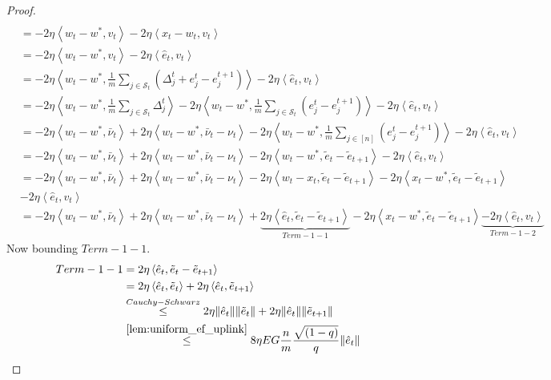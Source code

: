 \documentclass{article} %
\def\S{{\mathcal S}}
\newcommand{\inner}[2]{\left\langle #1, #2 \right\rangle}
\begin{document}
\begin{proof}
\begin{align*}
        \\
        & = - 2\eta \inner{w_t - w^*}{v_t} - 2\eta \inner{x_t - w_t}{v_t}
        \\
        &= - 2\eta \inner{w_t - w^*}{v_t} - 2\eta \inner{\hat{e}_t}{v_t}
        \\
        & = - 2\eta \inner{w_t - w^*}{\frac{1}{m}\sum_{j \in \S_t}(\Delta_j^t + e_j^t - e_j^{t+1})} - 2\eta \inner{\hat{e}_t}{v_t}
        \\
        & = - 2\eta \inner{w_t - w^*}{\frac{1}{m}\sum_{j \in \S_t}\Delta_j^t } - 2\eta \inner{w_t - w^*}{\frac{1}{m}\sum_{j \in \S_t}(e_j^t - e_j^{t+1})} - 2\eta \inner{\hat{e}_t}{v_t}
        \\
        & = - 2\eta \inner{w_t - w^*}{\bar{\nu}_t} + 2\eta \inner{w_t - w^*}{\bar{\nu}_t - \nu_t} - 2\eta \inner{w_t - w^*}{\frac{1}{m}\sum_{j \in [n]}(e_j^t - e_j^{t+1})} - 2\eta \inner{\hat{e}_t}{v_t}
        \\
        &= - 2\eta \inner{w_t - w^*}{\bar{\nu}_t} + 2\eta \inner{w_t - w^*}{\bar{\nu}_t - \nu_t} - 2\eta \inner{w_t - w^*}{\tilde{e}_t - \tilde{e}_{t+1}} - 2\eta \inner{\hat{e}_t}{v_t}
        \\
        & = - 2\eta \inner{w_t - w^*}{\bar{\nu}_t} + 2\eta \inner{w_t - w^*}{\bar{\nu}_t - \nu_t} - 2\eta \inner{w_t - x_t}{\tilde{e}_t - \tilde{e}_{t+1}} - 2\eta \inner{x_t - w^*}{\tilde{e}_t - \tilde{e}_{t+1}} 
        \\
        &- 2\eta \inner{\hat{e}_t}{v_t}
        \\
        & = - 2\eta \inner{w_t - w^*}{\bar{\nu}_t} + 2\eta \inner{w_t - w^*}{\bar{\nu}_t - \nu_t} + \underbrace{2\eta \inner{\hat{e}_t}{\tilde{e}_t - \tilde{e}_{t+1}}}_{Term-1-1} - 2\eta \inner{x_t - w^*}{\tilde{e}_t - \tilde{e}_{t+1}} \underbrace{- 2\eta \inner{\hat{e}_t}{v_t}}_{Term-1-2}
    \end{align*}
    Now bounding $Term-1-1$.
    \begin{align*}
        Term-1-1 &= 2\eta \inner{\hat{e}_t}{\tilde{e}_t - \tilde{e}_{t+1}}
        \\
        & = 2\eta \inner{\hat{e}_t}{\tilde{e}_t} + 2\eta \inner{\hat{e}_t}{\tilde{e}_{t+1}}
        \\
        &\overset{Cauchy-Schwarz}{\leq} 2\eta\|\hat{e}_t\|\|\tilde{e}_t\| + 2\eta\|\hat{e}_t\|\|\tilde{e}_{t+1}\|
        \\
        &\overset{\Cref{lem:uniform_ef_uplink}}{\leq}8\eta EG\frac{n}{m} \frac{\sqrt{(1-q)}}{q} \|\hat{e}_t\|
    \end{align*}

\end{proof}
\end{document}
